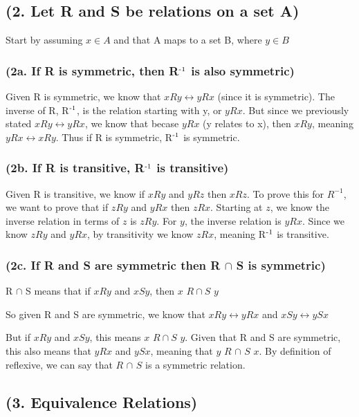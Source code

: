 \documentclass{article}
\begin{document}
\subsection{(2. Let R and S be relations on a set A)}
Start by assuming $x \in A$ and that A maps to a set B, where $y \in B$
\subsubsection{(2a. If R is symmetric, then R$\textsuperscript{-1}$ is also symmetric)}
\noindent Given R is symmetric, we know that $xRy \leftrightarrow yRx$ (since it is symmetric).  The inverse of R, R$\textsuperscript{-1}$, is the relation starting with y, or $yRx$.  But since we previously stated $xRy \leftrightarrow yRx$, we know that becase $yRx$ (y relates to x), then $xRy$, meaning $yRx \leftrightarrow xRy$.  Thus if R is symmetric, R$\textsuperscript{-1}$ is symmetric.

\subsubsection{(2b. If R is transitive, R$\textsuperscript{-1}$ is transitive)}

Given R is transitive, we know if $xRy$ and $yRz$ then $xRz$.  To prove this for $R^{-1}$, we want to prove that if $zRy$ and $yRx$ then $zRx$.  Starting at $z$, we know the inverse relation in terms of $z$ is $zRy$.  For $y$, the inverse relation is $yRx$.  Since we know $zRy$ and $yRx$, by transitivity we know $zRx$, meaning R$\textsuperscript{-1}$ is transitive.

\subsubsection{(2c. If R and S are symmetric then R $\cap$ S is symmetric)}

R $\cap$ S means that if $xRy$ and $xSy$, then $x$ $R \cap S$ $y$ \par\noindent

\noindent So given R and S are symmetric, we know that $xRy \leftrightarrow yRx$ and $xSy \leftrightarrow ySx$ \par\noindent
But if $xRy$ and $xSy$, this means $x$ $R \cap S$ $y$.  Given that R and S are symmetric, this also means that $yRx$ and $ySx$, meaning that $y$ $R$ $\cap$ $S$ $x$.  By definition of reflexive, we can say that $R$ $\cap$ $S$ is a symmetric relation.

\subsection{(3. Equivalence Relations)}
\end{document}
